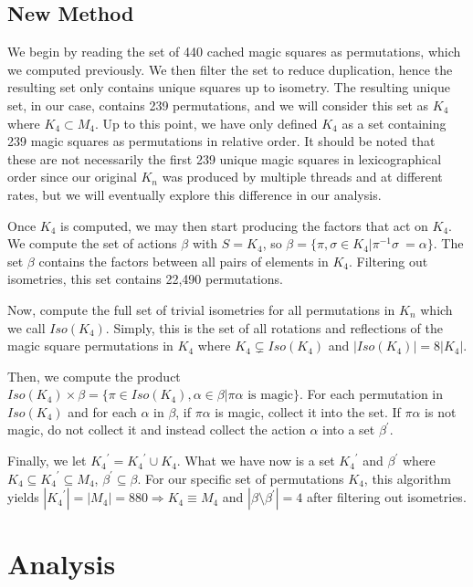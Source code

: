 \documentclass{rhumj_new}
\begin{document}
\subsection{New Method}

We begin by reading the set of 440 cached magic squares as permutations, which we computed
previously. We then filter the set to reduce duplication, hence the resulting set only contains
unique squares up to isometry. The resulting unique set, in our case, contains 239 permutations,
and we will consider this set as $K_4$ where $K_4\subset M_4$. Up to this point, we have only
defined $K_4$ as a set containing 239 magic squares as permutations in relative order. It should be
noted that these are not necessarily the first 239 unique magic squares in lexicographical order
since our original $K_n$ was produced by multiple threads and at different rates, but we will
eventually explore this difference in our analysis.

Once $K_4$ is computed, we may then start producing the factors that act on $K_4$. We compute
the set of actions $\beta$ with $S = K_4$, so  $\beta = \{\pi,\sigma\in K_4| \pi^{-1}\sigma\ =
  \alpha\}$. The set $\beta$ contains the factors between all pairs of elements in $K_4$. Filtering
out isometries, this set contains 22,490 permutations.

Now, compute the full set of trivial isometries for all permutations in $K_n$ which we call
$Iso(K_4)$. Simply, this is the set of all rotations and reflections of the magic square
permutations in $K_4$ where $K_4\subsetneq Iso(K_4)$ and $|Iso(K_4)| = 8|K_4|$.

Then, we compute the product $Iso(K_4)\times\beta = \{\pi\in Iso(K_4),\alpha\in\beta |
  \pi\alpha \text{ is magic}\}$. For each permutation in $Iso(K_4)$ and for each $\alpha$ in
$\beta$,
if $\pi\alpha$ is magic, collect it into the set. If $\pi\alpha$ is not magic, do not collect it
and instead collect the action $\alpha$ into a set ${\beta}^\prime$.

Finally, we let ${K_4}^\prime = {K_4}^\prime \cup K_4$. What we have now is a set
${K_4}^\prime$ and ${\beta}^\prime$ where $K_4 \subseteq {K_4}^\prime \subseteq M_4$,
${\beta}^\prime \subseteq \beta$. For our specific set of permutations $K_4$, this algorithm yields
$|{K_4}^\prime| = |M_4| = 880 \Rightarrow K_4 \equiv M_4$ and $|\beta \setminus{\beta}^\prime| = 4$
after filtering out isometries.

\section{Analysis}
\end{document}
